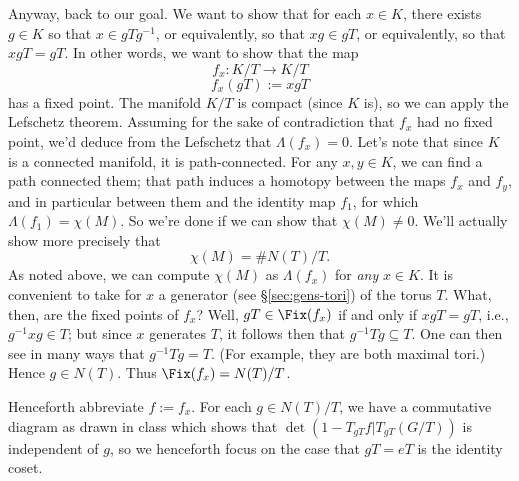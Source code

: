 \documentclass[reqno]{amsart} 
\begin{document}
Anyway, back to our goal.  We want to show that for each $x \in K$, there exists $g \in K$ so that $x \in g T g^{-1}$, or equivalently, so that $x g \in g T$, or equivalently, so that $x g T = g T$.  In other words, we want to show that the map
\begin{equation*}
  f_x : K/T \rightarrow K/T
\end{equation*}
\begin{equation*}
  f_x(g T) := x g T
\end{equation*}
has a fixed point.  The manifold $K/T$ is compact (since $K$ is), so we can apply the Lefschetz theorem.  Assuming for the sake of contradiction that $f_x$ had no fixed point, we'd deduce from the Lefschetz that $\Lambda(f_x) = 0$.  Let's note that since $K$ is a connected manifold, it is path-connected.  For any $x,y \in K$, we can find a path connected them; that path induces a homotopy between the maps $f_x$ and $f_y$, and in particular between them and the identity map $f_1$, for which $\Lambda(f_1) = \chi(M)$.  So we're done if we can show that $\chi(M) \neq 0$.  We'll actually show more precisely that
\begin{equation}
  \chi(M) = \# N(T)/T.
\end{equation}
As noted above, we can compute $\chi(M)$ as $\Lambda(f_x)$ for \emph{any} $x \in K$.  It is convenient to take for $x$ a generator (see \S\ref{sec:gens-tori}) of the torus $T$.  What, then, are the fixed points of $f_x$?  Well, $g T \in \Fix(f_x)$ if and only if $x g T = g T$, i.e., $g^{-1} x g \in T$; but since $x$ generates $T$, it follows then that $g^{-1} T g \subseteq T$.  One can then see in many ways that $g^{-1} T g = T$.  (For example, they are both maximal tori.)  Hence $g \in N(T)$.  Thus $\Fix(f_x) = N(T) / T$.

Henceforth abbreviate $f := f_x$.  For each $g \in N(T) / T$, we have a commutative diagram as drawn in class which shows that $\det(1 - T_{g T} f | T_{g T}(G/T))$ is independent of $g$, so we henceforth focus on the case that $g T = e T$ is the identity coset.
\end{document}
